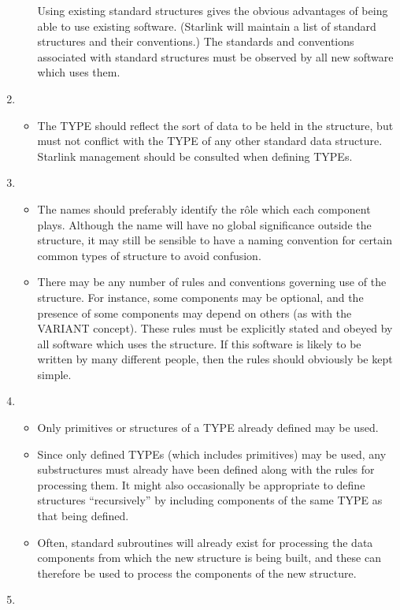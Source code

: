 \begin{enumerate}
\begin{itemize}
Using existing standard structures gives the obvious advantages of being
able to use existing software.  (Starlink will maintain a list of
standard structures and their conventions.)  The standards and
conventions associated with standard structures must be observed by all
new software which uses them.
\end{itemize}
\item
\begin{itemize}
\item
The TYPE should reflect the sort of data to be held in the structure, but
must not conflict with the TYPE of any other standard data structure. 
Starlink management should be consulted when defining TYPEs.
\end{itemize}
\item
\begin{itemize}
\item
The names should preferably identify the r\^{o}le which each component
plays.  Although the name will have no global significance outside the
structure, it may still be sensible to have a naming convention for
certain common types of structure to avoid confusion. 
\item
There may be any number of rules and conventions governing use of the
structure.  For instance, some components may be optional, and the
presence of some components may depend on others (as with the VARIANT
concept). These rules must be explicitly stated and obeyed by all
software which uses the structure.  If this software is likely to be
written by many different people, then the rules should obviously be
kept simple.
\end{itemize}
\item
\begin{itemize}
\item
Only primitives or structures of a TYPE already defined may be used.
\item
Since only defined TYPEs (which includes primitives) may be used, any
substructures must already have been defined along with the rules for
processing them.  It  might also occasionally be appropriate to
define structures ``recursively'' by including components of the same
TYPE as that being defined. 
\item
Often, standard subroutines will already exist for
processing the data components
from which the new structure is being built, and these can therefore be
used to process the components of the new structure. 
\end{itemize}
\item

\end{enumerate}
